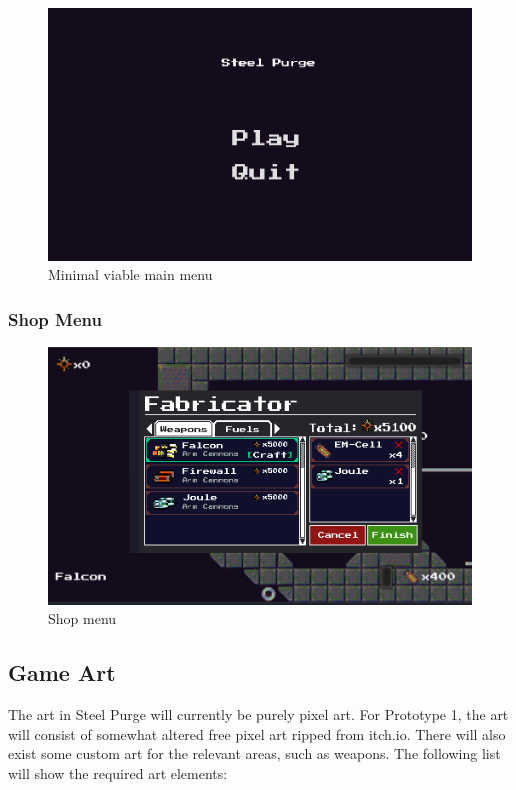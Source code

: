 \documentclass[../Main.tex]{subfiles}
\begin{document}
\begin{figure}[H]
	\centering
	\includegraphics[width=\columnwidth]{Figures/StartMenu.png}
	\caption{Minimal viable main menu}
\end{figure}

\subsubsection{Shop Menu}

\begin{figure}[H]
	\centering
	\includegraphics[width=\columnwidth]{Figures/ShopMenu.png}
	\caption{Shop menu}
\end{figure}

\subsection{Game Art}

The art in Steel Purge will currently be purely pixel art. For Prototype 1, the art will consist of somewhat altered free pixel art ripped from itch.io. There will also exist some custom art for the relevant areas, such as weapons. The following list will show the required art elements:
\end{document}
